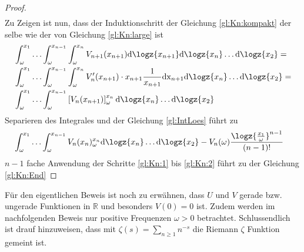 \begin{lemma}
\begin{proof}
\begin{align}
		\end{align}
		Zu Zeigen ist nun, dass der Induktionschritt der Gleichung \ref{gl:Kn:kompakt} der selbe wie der von Gleichung \ref{gl:Kn:large} ist
		\begin{align}
			&\int_{\omega}^{x_1} \hdots \int_{\omega}^{x_{n-1}}  \int_{\omega}^{x_{n}} V_{n+1}(x_{n+1}) \mathrm{d} \logz{x_{n+1}} \mathrm{d} \logz{x_{n}} \hdots \mathrm{d}  \logz{x_2}\label{gl:Kn:1} = \\
			&\int_{\omega}^{x_1} \hdots \int_{\omega}^{x_{n-1}}  \int_{\omega}^{x_{n}} V'_{n}(x_{n+1}) \cdot x_{n+1} \frac{1}{x_{n+1}} \mathrm{dx}_{n+1} \mathrm{d} \logz{x_{n}} \hdots  \mathrm{d} \logz{x_2}\label{gl:Kn:2} = \\
			&\int_{\omega}^{x_1} \hdots \int_{\omega}^{x_{n-1}}  \left[V_{n}(x_{n+1})\right]_{\omega}^{x_n} \mathrm{d} \logz{x_{n}} \hdots \mathrm{d}  \logz{x_2}\label{gl:Kn:3}
		\end{align}
		Separieren des Integrales und der Gleichung \ref{gl:IntLoes} führt zu
		\begin{align}
			&\int_{\omega}^{x_1} \hdots \int_{\omega}^{x_{n-1}}  V_{n}(x_{n})_{\omega}^{x_n} \mathrm{d} \logz{x_{n}} \hdots \mathrm{d} \logz{x_2} - V_n(\omega) \frac{\logz{\frac{x_1}{\omega}}^{n-1}}{(n-1)!}
		\end{align}
		$n-1$ fache Anwendung der Schritte \ref{gl:Kn:1} bis \ref{gl:Kn:2} führt zu der Gleichung \ref{gl:Kn:End}
	\end{proof}
\end{lemma}
Für den eigentlichen Beweis ist noch zu erwähnen, dass $U$ und $V$ gerade bzw. ungerade Funktionen in $\mathbb{R}$ und besonders $V(0) = 0$ ist. Zudem werden im nachfolgenden Beweis nur positive Frequenzen $\omega > 0$ betrachtet. Schlussendlich ist drauf hinzuweisen, dass mit $\zeta(s) = \sum_{n\geq1} n^{-s}$ die Riemann $\zeta$ Funktion gemeint ist. 
